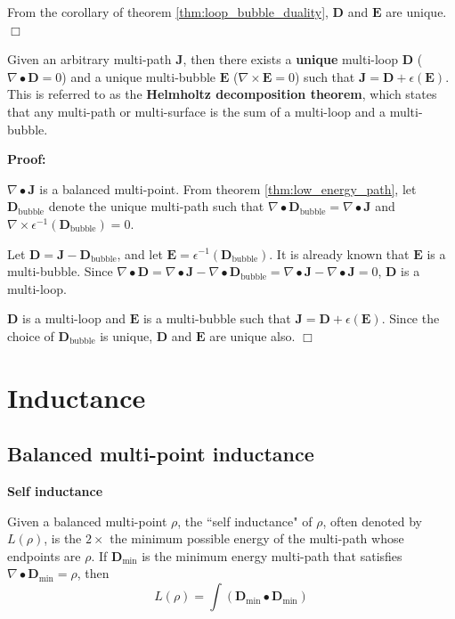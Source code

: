From the corollary of theorem \ref{thm:loop_bubble_duality}, \(\mathbf{D}\) and \(\mathbf{E}\) are unique. \(\Box\)


\begin{thm}\label{thm:helmholtz_decomposition_theorem} 
Given an arbitrary multi-path \(\mathbf{J}\), then there exists a {\bf unique} multi-loop \(\mathbf{D}\) (\(\nabla \bullet \mathbf{D} = 0\)) and a unique multi-bubble \(\mathbf{E}\) (\(\nabla \times \mathbf{E} = 0\)) such that \(\mathbf{J} = \mathbf{D} + \epsilon(\mathbf{E})\). This is referred to as the {\bf Helmholtz decomposition theorem}, which states that any multi-path or multi-surface is the sum of a multi-loop and a multi-bubble.
\end{thm}
\textbf{Proof:}

\(\nabla \bullet \mathbf{J}\) is a balanced multi-point. From theorem \ref{thm:low_energy_path}, let \(\mathbf{D}_{\text{bubble}}\) denote the unique multi-path such that \(\nabla \bullet \mathbf{D}_{\text{bubble}} = \nabla \bullet \mathbf{J}\) and \(\nabla \times \epsilon^{-1}(\mathbf{D}_{\text{bubble}}) = 0\).

Let \(\mathbf{D} = \mathbf{J} - \mathbf{D}_{\text{bubble}}\), and let \(\mathbf{E} = \epsilon^{-1}(\mathbf{D}_{\text{bubble}})\). It is already known that \(\mathbf{E}\) is a multi-bubble. Since \(\nabla \bullet \mathbf{D} = \nabla \bullet \mathbf{J} - \nabla \bullet \mathbf{D}_{\text{bubble}} = \nabla \bullet \mathbf{J} - \nabla \bullet \mathbf{J} = 0\), \(\mathbf{D}\) is a multi-loop. 

\(\mathbf{D}\) is a multi-loop and \(\mathbf{E}\) is a multi-bubble such that \(\mathbf{J} = \mathbf{D} + \epsilon(\mathbf{E})\). Since the choice of \(\mathbf{D}_{\text{bubble}}\) is unique, \(\mathbf{D}\) and \(\mathbf{E}\) are unique also. \(\Box\)



\section{Inductance}

\subsection{Balanced multi-point inductance}

\textbf{Self inductance}

Given a balanced multi-point \(\rho\), the ``self inductance" of \(\rho\), often denoted by \(L(\rho)\), is the \(2 \times\) the minimum possible energy of the multi-path whose endpoints are \(\rho\). If \(\mathbf{D}_{\text{min}}\) is the minimum energy multi-path that satisfies \(\nabla \bullet \mathbf{D}_{\text{min}} = \rho\), then 
\[L(\rho) = \int (\mathbf{D}_{\text{min}} \bullet \mathbf{D}_{\text{min}})\]  

